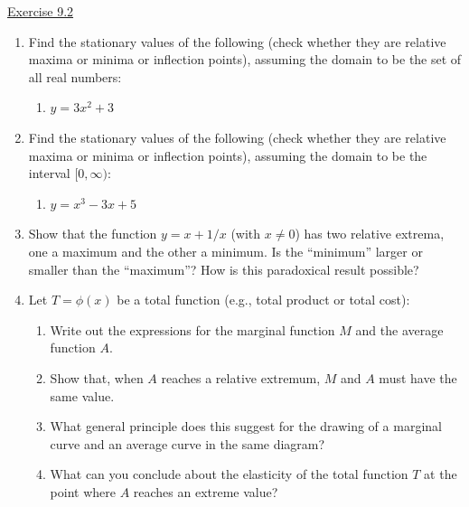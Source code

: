 \underline{Exercise 9.2}
\begin{enumerate}
\item[1.] Find the stationary values of the following (check whether they are relative maxima or minima or inflection points), assuming the domain to be the set of all real numbers:
\begin{enumerate}
\item[(c)] $y = 3x^{2} + 3$
\end{enumerate}

\item[2.] Find the stationary values of the following (check whether they are relative maxima or minima or inflection points), assuming the domain to be the interval $[0, \infty)$:
\begin{enumerate}
\item[(a)] $y = x^{3} - 3x + 5$
\end{enumerate}

\item[3.] Show that the function $y = x + 1/x$ (with $x \neq 0$) has two relative extrema, one a maximum and the other a minimum. Is the ``minimum'' larger or smaller than the ``maximum''? How is this paradoxical result possible?

\item[4.] Let $T = \phi(x)$ be a total function (e.g., total product or total cost):
\begin{enumerate}
\item[(a)] Write out the expressions for the marginal function $M$ and the average function $A$.
\item[(b)] Show that, when $A$ reaches a relative extremum, $M$ and $A$ must have the same value.
\item[(c)] What general principle does this suggest for the drawing of a marginal curve and an average curve in the same diagram?
\item[(d)] What can you conclude about the elasticity of the total function $T$ at the point where $A$ reaches an extreme value?
\end{enumerate}

\end{enumerate}
